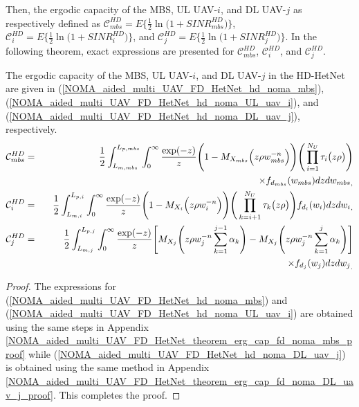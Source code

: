 Then, the ergodic capacity of the MBS, UL UAV-$i$, and DL UAV-$j$ as respectively defined as $\mathcal{C}_{mbs}^{HD} = E\Big\{\frac{1}{2}\ln\Big(1+SINR_{mbs}^{HD}\Big)\Big\}$, $\mathcal{C}_{i}^{HD} = E\Big\{\frac{1}{2}\ln\Big(1+SINR_{i}^{HD}\Big)\Big\}$, and $\mathcal{C}_{j}^{HD} = E\Big\{\frac{1}{2}\ln\Big(1+SINR_{j}^{HD}\Big)\Big\}$. In the following theorem, exact expressions are presented for $\mathcal{C}_{mbs}^{HD}$, $\mathcal{C}_{i}^{HD}$, and $\mathcal{C}_{j}^{HD}$.
\begin{theorem} \label{NOMA_aided_multi_UAV_FD_HetNet_theorem_erg_cap_hd_noma}
The ergodic capacity of the MBS, UL UAV-$i$, and DL UAV-$j$ in the HD-HetNet are given in (\ref{NOMA_aided_multi_UAV_FD_HetNet_hd_noma_mbs}), (\ref{NOMA_aided_multi_UAV_FD_HetNet_hd_noma_UL_uav_i}), and (\ref{NOMA_aided_multi_UAV_FD_HetNet_hd_noma_DL_uav_j}), respectively.
\begin{eqnarray}
\mathcal{C}_{mbs}^{HD} & = & \frac{1}{2} \int_{L_{m,mbs}}^{L_{p,mbs}} \int_{0}^{\infty} \frac{\exp(-z)}{z} \Bigg(1-M_{X_{mbs}}\Big(z\rho  w_{mbs}^{-n}\Big)\Bigg) \Bigg( \prod_{i=1}^{N_U} \tau_i\big(z\rho\big) \Bigg) \nonumber \\
 & & \hspace{8cm} \times f_{d_{mbs}}(w_{mbs}) {dz dw_{mbs}}_, \label{NOMA_aided_multi_UAV_FD_HetNet_hd_noma_mbs} \\
\mathcal{C}_{i}^{HD} & = & \frac{1}{2} \int_{L_{m,i}}^{L_{p,i}} \int_{0}^{\infty} \frac{\exp(-z)}{z} \Bigg(1-M_{X_{i}}\Big(z\rho  w_{i}^{-n}\Big)\Bigg) \Bigg( \prod_{k=i+1}^{N_U} \tau_k\big(z\rho\big) \Bigg) f_{d_{i}}(w_{i}) {dz dw_{i}}_, \label{NOMA_aided_multi_UAV_FD_HetNet_hd_noma_UL_uav_i} \\
\mathcal{C}_{j}^{HD} & = & \frac{1}{2} \int_{L_{m,j}}^{L_{p,j}} \int_{0}^{\infty} \frac{\exp(-z)}{z} \Bigg[M_{X_j}\Bigg(z \rho w_j^{-n} \sum_{k=1}^{j-1}\alpha_k \Bigg) - M_{X_j}\Bigg(z \rho w_j^{-n} \sum_{k=1}^{j}\alpha_k\Bigg)\Bigg] \nonumber \\
 & & \hspace{9.1cm} \times f_{d_{j}}(w_j) dz {dw_j}_. \label{NOMA_aided_multi_UAV_FD_HetNet_hd_noma_DL_uav_j}
\end{eqnarray}
\end{theorem}
\begin{proof}
The expressions for (\ref{NOMA_aided_multi_UAV_FD_HetNet_hd_noma_mbs}) and (\ref{NOMA_aided_multi_UAV_FD_HetNet_hd_noma_UL_uav_i}) are obtained using the same steps in Appendix \ref{NOMA_aided_multi_UAV_FD_HetNet_theorem_erg_cap_fd_noma_mbs_proof} while (\ref{NOMA_aided_multi_UAV_FD_HetNet_hd_noma_DL_uav_j}) is obtained using the same method in Appendix \ref{NOMA_aided_multi_UAV_FD_HetNet_theorem_erg_cap_fd_noma_DL_uav_j_proof}. This completes the proof.
\end{proof}

